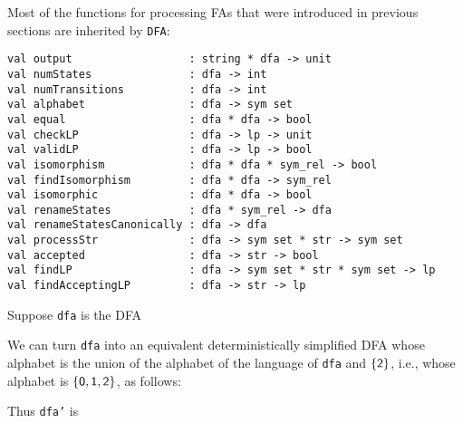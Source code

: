 Most of the functions for processing FAs that were introduced
in previous sections are inherited by \texttt{DFA}:
\begin{verbatim}
val output                  : string * dfa -> unit 
val numStates               : dfa -> int
val numTransitions          : dfa -> int
val alphabet                : dfa -> sym set
val equal                   : dfa * dfa -> bool
val checkLP                 : dfa -> lp -> unit
val validLP                 : dfa -> lp -> bool
val isomorphism             : dfa * dfa * sym_rel -> bool
val findIsomorphism         : dfa * dfa -> sym_rel
val isomorphic              : dfa * dfa -> bool
val renameStates            : dfa * sym_rel -> dfa
val renameStatesCanonically : dfa -> dfa
val processStr              : dfa -> sym set * str -> sym set
val accepted                : dfa -> str -> bool
val findLP                  : dfa -> sym set * str * sym set -> lp
val findAcceptingLP         : dfa -> str -> lp
\end{verbatim}
%
%
%
%
%
%
%
%
%
%
%
%
%
%
%
%

Suppose \texttt{dfa} is the DFA
\begin{center}

\end{center}
We can turn \texttt{dfa} into an equivalent deterministically simplified
DFA whose alphabet is the union of the alphabet of the language
of \texttt{dfa} and $\{\mathsf{2}\}$, i.e., whose alphabet is
$\{\mathsf{0},\mathsf{1},\mathsf{2}\}$, as follows:

Thus \texttt{dfa'} is
\begin{center}

\end{center}

